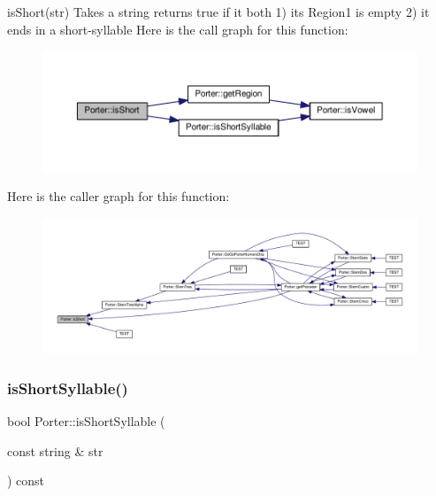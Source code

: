 is\+Short(str) Takes a string returns true if it both 1) its Region1 is empty 2) it ends in a short-\/syllable Here is the call graph for this function\+:
\nopagebreak
\begin{figure}[H]
\begin{center}
\leavevmode
\includegraphics[width=350pt]{class_porter_a35b1cc5606d4e78d1f69ac4037fdde87_cgraph}
\end{center}
\end{figure}
Here is the caller graph for this function\+:
\nopagebreak
\begin{figure}[H]
\begin{center}
\leavevmode
\includegraphics[width=350pt]{class_porter_a35b1cc5606d4e78d1f69ac4037fdde87_icgraph}
\end{center}
\end{figure}
\mbox{\label{class_porter_a36e6678f68a4cc29371cc0111a8c8860}} 
\subsubsection{\texorpdfstring{is\+Short\+Syllable()}{isShortSyllable()}}
{\footnotesize\ttfamily bool Porter\+::is\+Short\+Syllable (\begin{DoxyParamCaption}\item[{const string \&}]{str }\end{DoxyParamCaption}) const}

